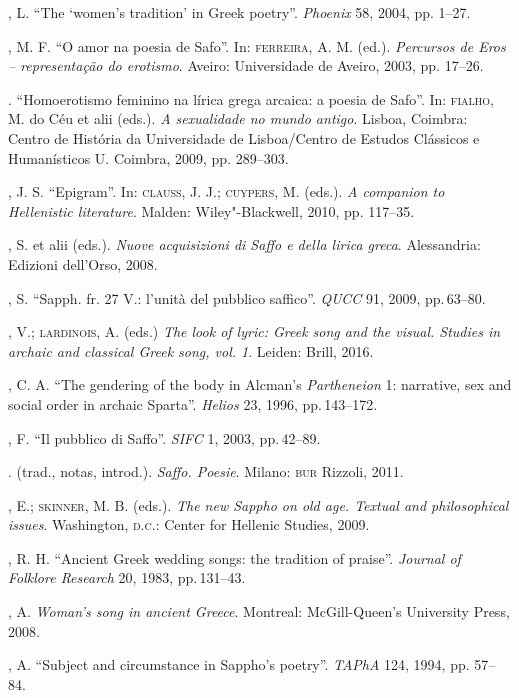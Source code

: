 \begin{bibliohedra}
, L. “The ‘women’s tradition’ in Greek poetry”. \textit{Phoenix} 58, 2004, pp. 1--27.

, M. F. “O amor na poesia de Safo”. In: \textsc{ferreira}, A. M. (ed.). \textit{Percursos de Eros -- representação do erotismo}. Aveiro: Universidade de Aveiro, 2003, pp. 17--26.

\titidem. “Homoerotismo feminino na lírica grega arcaica: a poesia de Safo”. In: \textsc{fialho}, M. do Céu et alii (eds.). \textit{A sexualidade no mundo antigo}. Lisboa, Coimbra: Centro de História da Universidade de Lisboa/Centro de Estudos Clássicos e Humanísticos U. Coimbra, 2009, pp. 289--303. 

, J. S. “Epigram”. In: \textsc{clauss}, J. J.; \textsc{cuypers}, M. (eds.). \textit{A companion to Hellenistic literature}. Malden: Wiley"-Blackwell, 2010, pp. 117--35. 

, S. et alii (eds.). \textit{Nuove acquisizioni di Saffo e della lirica greca}. Alessandria: Edizioni dell'Orso, 2008.

, S. “Sapph. fr. 27 V.: l’unità del pubblico saffico”. \textit{QUCC} 91, 2009, pp.\,63--80.

, V.; \textsc{lardinois}, A. (eds.) \textit{The look of lyric: Greek song and the visual. Studies in archaic and classical Greek song, vol. 1}. Leiden: Brill, 2016.

, C. A. “The gendering of the body in Alcman’s \textit{Partheneion} 1: narrative, sex and social order in archaic Sparta”. \textit{Helios} 23, 1996, pp.\,143--172.

, F. “Il pubblico di Saffo”. \textit{SIFC} 1, 2003, pp.\,42--89.

\titidem. (trad., notas, introd.). \textit{Saffo. Poesie}. Milano: \textsc{bur} Rizzoli, 2011.

, E.; \textsc{skinner}, M. B. (eds.). \textit{The new Sappho on old age. Textual and philosophical issues}. Washington, \textsc{d.c.}: Center for Hellenic Studies, 2009.

, R. H. “Ancient Greek wedding songs: the tradition of praise”. \textit{Journal of Folklore Research} 20, 1983, pp.\,131--43.

, A. \textit{Woman’s song in ancient Greece}. Montreal: McGill-Queen’s University Press, 2008. 

, A. “Subject and circumstance in Sappho’s poetry”. \textit{TAPhA} 124, 1994, pp. 57--84.


\end{bibliohedra}
